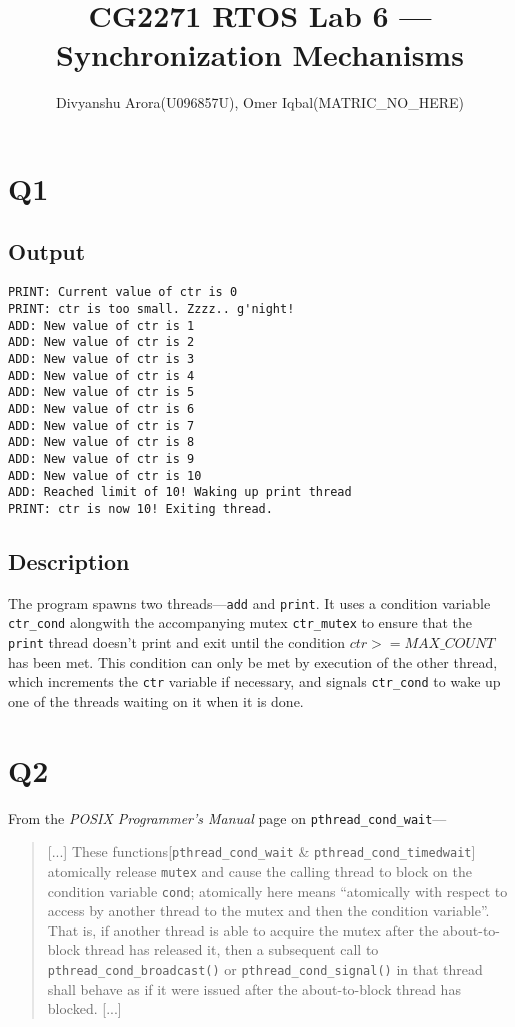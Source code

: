 \documentclass[runningheads,a4paper]{report}
\title{CG2271 RTOS Lab 6 --- Synchronization Mechanisms}
\author{Divyanshu Arora(U096857U), Omer Iqbal(MATRIC\_NO\_HERE)}
\begin{document}
\maketitle
\section*{Q1}
\subsection{Output}
\begin{lstlisting}
PRINT: Current value of ctr is 0
PRINT: ctr is too small. Zzzz.. g'night!
ADD: New value of ctr is 1
ADD: New value of ctr is 2
ADD: New value of ctr is 3
ADD: New value of ctr is 4
ADD: New value of ctr is 5
ADD: New value of ctr is 6
ADD: New value of ctr is 7
ADD: New value of ctr is 8
ADD: New value of ctr is 9
ADD: New value of ctr is 10
ADD: Reached limit of 10! Waking up print thread
PRINT: ctr is now 10! Exiting thread.
\end{lstlisting}

\subsection{Description}

The program spawns two threads---\texttt{add} and \texttt{print}. It
uses a condition variable \texttt{ctr\_cond} alongwith the
accompanying mutex \texttt{ctr\_mutex} to ensure that the
\texttt{print} thread doesn't print and exit until the condition
$ctr>=MAX\_COUNT$ has been met.
This condition can only be met by execution of the other thread, which
increments the \texttt{ctr} variable if necessary, and signals
\texttt{ctr\_cond} to wake up one of the threads waiting on it when it
is done.

\section*{Q2}

From the \textit{POSIX Programmer's Manual} page on
\texttt{pthread\_cond\_wait}---
\begin{quotation}
[...]
These functions[\texttt{pthread\_cond\_wait} \& \texttt{pthread\_cond\_timedwait}] atomically release \texttt{mutex}
  and cause the calling thread to block on the condition variable
  \texttt{cond}; atomically here means ``atomically with respect to access by another thread to the mutex and  then  the  condition
       variable''.  That  is, if another thread is able to acquire the mutex after the about-to-block thread has released it, then a subsequent call to \texttt{pthread\_cond\_broadcast()} or \texttt{pthread\_cond\_signal()} in that thread shall behave as
       if it were issued after the about-to-block thread has blocked. [...]
\end{quotation}
\end{document}

